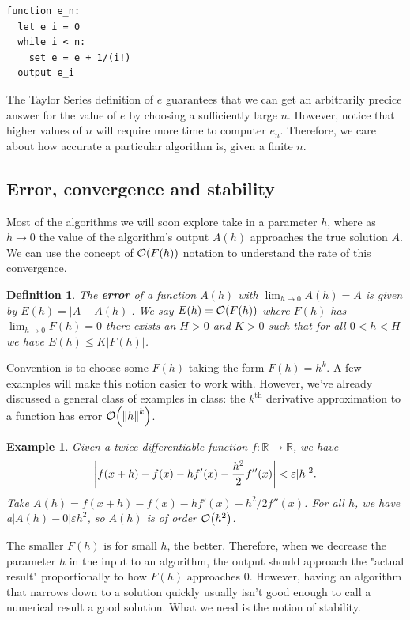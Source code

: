 \documentclass{article}
\newtheorem{definition}{Definition}[section]
\newtheorem{example}{Example}[section]
\newcommand{\R}{\mathbb{R}}
\newcommand{\0}{\vb{0}}
\begin{document}
\begin{verbatim}
function e_n:
  let e_i = 0
  while i < n:
    set e = e + 1/(i!)
  output e_i
\end{verbatim}
The Taylor Series definition of $e$ guarantees that we can get an arbitrarily precice answer for the value of $e$ by choosing a sufficiently large $n$. However, notice that higher values of $n$ will require more time to computer $e_n$. Therefore, we care about how accurate a particular algorithm is, given a finite $n$.

\subsection{Error, convergence and stability}

Most of the algorithms we will soon explore take in a parameter $h$, where as $h\to0$ the value of the algorithm's output $A(h)$ approaches the true solution $A$. We can use the concept of $\order{F(h)}$ notation to understand the rate of this convergence.

\begin{definition}
  The \textbf{error} of a function $A(h)$ with $\lim_{h\to0}A(h) = A$ is given by $E(h) = |A - A(h)|$. We say $E(h) = \order{F(h)}$ where $F(h)$ has $\lim_{h\to0}F(h) = 0$ there exists an $H > 0$ and $K > 0$ such that for all $0 < h < H$ we have $E(h) \leq K|F(h)|$.
\end{definition}

Convention is to choose some $F(h)$ taking the form $F(h) = h^k$. A few examples will make this notion easier to work with. However, we've already discussed a general class of examples in class: the $k^\mathrm{th}$ derivative approximation to a function has error $\order{\norm{h}^k}$.

\begin{example}
  Given a twice-differentiable function $f: \R\to\R$, we have
  \[\qty|f(x + h) - f(x) - hf'(x) - \frac{h^2}{2}f''(x)| < \varepsilon|h|^2.\]
  Take $A(h) = f(x+h) - f(x) - hf'(x) - h^2/2f''(x)$. For all $h$, we have a$|A(h) - 0| \varepsilon h^2$, so $A(h)$ is of order $\order{h^2}$.
\end{example}


The smaller $F(h)$ is for small $h$, the better. Therefore, when we decrease the parameter $h$ in the input to an algorithm, the output should approach the "actual result" proportionally to how $F(h)$ approaches $0$. However, having an algorithm that narrows down to a solution quickly usually isn't good enough to call a numerical result a good solution. What we need is the notion of stability.
\end{document}
